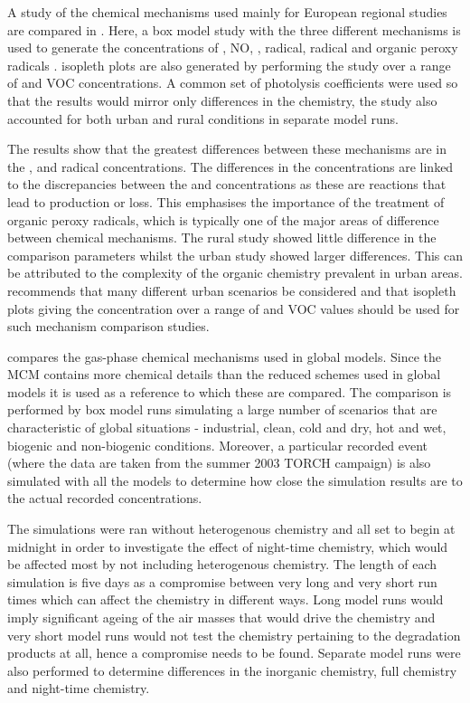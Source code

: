 A study of the chemical mechanisms used mainly for European regional studies are compared in \citep{Gross:2003}. 
Here, a box model study with the three different mechanisms is used to generate the concentrations of , NO, ,  radical,  radical and organic peroxy radicals . 
 isopleth plots are also generated by performing the study over a range of  and VOC concentrations. 
A common set of photolysis coefficients were used so that the results would mirror only differences in the chemistry, the study also accounted for both urban and rural conditions in separate model runs.

The results show that the greatest differences between these mechanisms are in the ,  and  radical concentrations. 
The differences in the  concentrations are linked to the discrepancies between the  and  concentrations as these are reactions that lead to  production or loss. 
This emphasises the importance of the treatment of organic peroxy radicals, which is typically one of the major areas of difference between chemical mechanisms. 
The rural study showed little difference in the comparison parameters whilst the urban study showed larger differences. 
This can be attributed to the complexity of the organic chemistry prevalent in urban areas. 
\citep{Gross:2003} recommends that many different urban scenarios be considered and that  isopleth plots giving the  concentration over a range of  and VOC values should be used for such mechanism comparison studies. 

\citep{Emmerson:2009} compares the gas-phase chemical mechanisms used in global models. 
Since the MCM contains more chemical details than the reduced schemes used in global models it is used as a reference to which these are compared. 
The comparison is performed by box model runs simulating a large number of scenarios that are characteristic of global situations - industrial, clean, cold and dry, hot and wet, biogenic and non-biogenic conditions. 
Moreover, a particular recorded event (where the data are taken from the summer 2003 TORCH campaign) is also simulated with all the models to determine how close the simulation results are to the actual recorded concentrations. 

The simulations were ran without heterogenous chemistry and all set to begin at midnight in order to investigate the effect of night-time chemistry, which would be affected most by not including heterogenous chemistry. 
The length of each simulation is five days as a compromise between very long and very short run times which can affect the chemistry in different ways. 
Long model runs would imply significant ageing of the air masses that would drive the chemistry and very short model runs would not test the chemistry pertaining to the degradation products at all, hence a compromise needs to be found. 
Separate model runs were also performed to determine differences in the inorganic chemistry, full chemistry and night-time chemistry.

